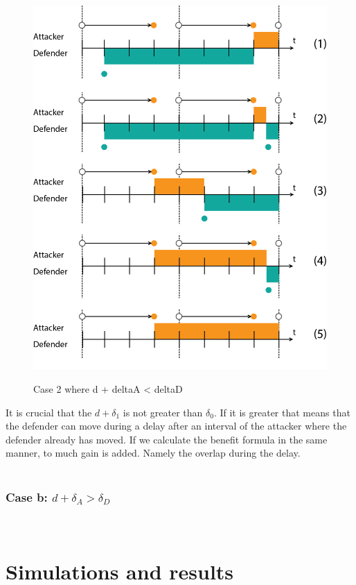 \documentclass[journal,a4paper]{IEEEtran}
\begin{document}
\begin{figure}[hbtp]
\caption{Case 2 where d + deltaA < deltaD}
\centering
\includegraphics[scale=0.5]{../../doc/template/Images/FlipItCase2.png}
\label{fig:case2}
\end{figure}


It is crucial that the $d + \delta_{1}$ is not greater than $ \delta_{0}$. If it is greater that means that the defender can move during a delay after an interval of the attacker where the defender already has moved. If we calculate the benefit formula in the same manner, to much gain is added. Namely the overlap during the delay. \\
~~\\

\subsubsection*{\textbf{Case b:} $d + \delta_{A} > \delta_{D}$}
~~~\\


\section{Simulations and results}
\end{document}
